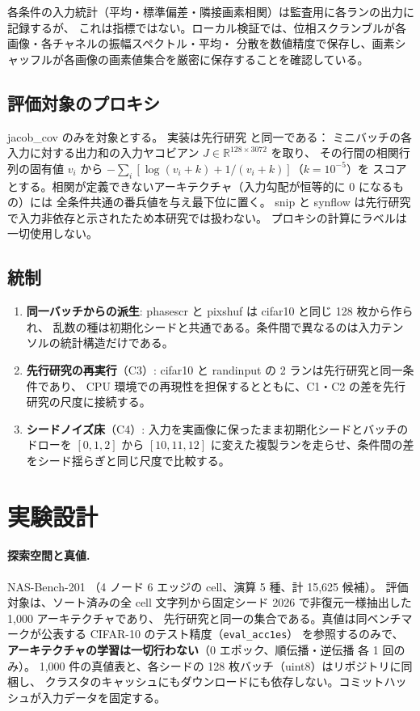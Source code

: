 \documentclass[11pt]{article}
\begin{document}
各条件の入力統計（平均・標準偏差・隣接画素相関）は監査用に各ランの出力に記録するが、
これは指標ではない。ローカル検証では、位相スクランブルが各画像・各チャネルの振幅スペクトル・平均・
分散を数値精度で保存し、画素シャッフルが各画像の画素値集合を厳密に保存することを確認している。

\subsection{評価対象のプロキシ}

jacob\_cov \cite{mellor2021naswot,abdelfattah2021zerocost} のみを対象とする。
実装は先行研究 \cite{airas20260903zcproxy} と同一である：
ミニバッチの各入力に対する出力和の入力ヤコビアン $J \in \mathbb{R}^{128 \times 3072}$ を取り、
その行間の相関行列の固有値 $v_i$ から $-\sum_i \left[\log(v_i + k) + 1/(v_i + k)\right]$（$k = 10^{-5}$）を
スコアとする。相関が定義できないアーキテクチャ（入力勾配が恒等的に 0 になるもの）には
全条件共通の番兵値を与え最下位に置く。
snip と synflow は先行研究で入力非依存と示されたため本研究では扱わない。
プロキシの計算にラベルは一切使用しない。

\subsection{統制}

\begin{enumerate}
\item \textbf{同一バッチからの派生}: phasescr と pixshuf は cifar10 と同じ 128 枚から作られ、
乱数の種は初期化シードと共通である。条件間で異なるのは入力テンソルの統計構造だけである。
\item \textbf{先行研究の再実行}（C3）: cifar10 と randinput の 2 ランは先行研究と同一条件であり、
CPU 環境での再現性を担保するとともに、C1・C2 の差を先行研究の尺度に接続する。
\item \textbf{シードノイズ床}（C4）: 入力を実画像に保ったまま初期化シードとバッチのドローを
$[0,1,2]$ から $[10,11,12]$ に変えた複製ランを走らせ、条件間の差をシード揺らぎと同じ尺度で比較する。
\end{enumerate}

\section{実験設計}
\label{sec:setup}

\paragraph{探索空間と真値.}
NAS-Bench-201 \cite{dong2020nasbench201}（4 ノード 6 エッジの cell、演算 5 種、計 15{,}625 候補）。
評価対象は、ソート済みの全 cell 文字列から固定シード 2026 で非復元一様抽出した 1{,}000 アーキテクチャであり、
先行研究と同一の集合である。真値は同ベンチマークが公表する CIFAR-10 のテスト精度（\texttt{eval\_acc1es}）
を参照するのみで、\textbf{アーキテクチャの学習は一切行わない}（0 エポック、順伝播・逆伝播 各 1 回のみ）。
1{,}000 件の真値表と、各シードの 128 枚バッチ（uint8）はリポジトリに同梱し、
クラスタのキャッシュにもダウンロードにも依存しない。コミットハッシュが入力データを固定する。
\end{document}
